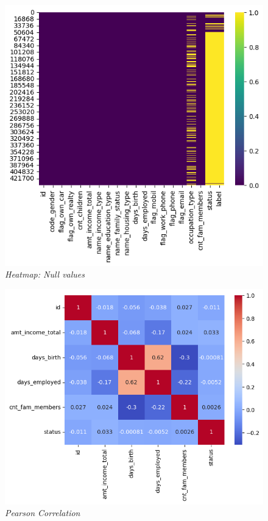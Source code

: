 \documentclass[10pt]{article}
\begin{document}
\begin{multicols}{2}
\begin{figure}[H]
    \centering
    \includegraphics[width=1\linewidth]{fig2.png}
    \caption{\justifying \textit{Heatmap: Null values}}
    \label{fig:PID Fuzzy}
\end{figure}

\begin{figure}[H]
    \centering
    \includegraphics[width=1\linewidth]{figure3.png}
    \caption{\justifying \textit{Pearson Correlation}}
    \label{fig:PID Fuzzy}
\end{figure}


\end{multicols}
\end{document}
